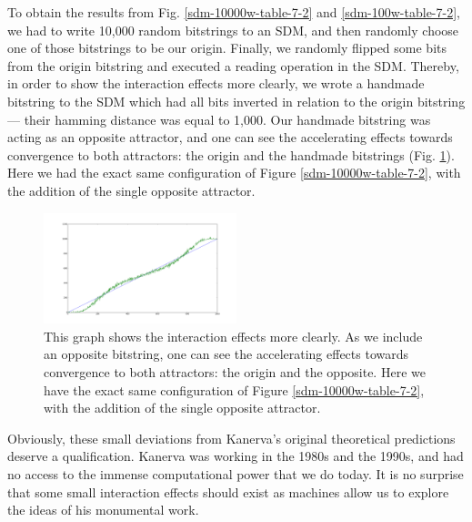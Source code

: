 To obtain the results from Fig. \ref{sdm-10000w-table-7-2} and \ref{sdm-100w-table-7-2}, we had to write 10,000 random bitstrings to an SDM, and then randomly choose one of those bitstrings to be our origin. Finally, we randomly flipped some bits from the origin bitstring and executed a reading operation in the SDM. Thereby, in order to show the interaction effects more clearly, we wrote a handmade bitstring to the SDM which had all bits inverted in relation to the origin bitstring --- their hamming distance was equal to 1,000. Our handmade bitstring was acting as an opposite attractor, and one can see the accelerating effects towards convergence to both attractors: the origin and the handmade bitstrings (Fig. \ref{sdm-10000w-notX-table-7-2}). Here we had the exact same configuration of Figure \ref{sdm-10000w-table-7-2}, with the addition of the single opposite attractor.

\begin{figure}[h]
\centering\includegraphics[width=0.5\textwidth]{images02/sdm-10000w-notX-table-7-2.png}
\caption{This graph shows the interaction effects more clearly.  As we include an opposite bitstring, one can see the accelerating effects towards convergence to both attractors: the origin and the opposite. Here we have the exact same configuration of Figure \ref{sdm-10000w-table-7-2}, with the addition of the single opposite attractor.
\label{sdm-10000w-notX-table-7-2}}
\end{figure}

Obviously, these small deviations from Kanerva's original theoretical predictions deserve a qualification.  Kanerva was working in the 1980s and the 1990s, and had no access to the immense computational power that we do today. It is no surprise that some small interaction effects should exist as machines allow us to explore the ideas of his monumental work.

